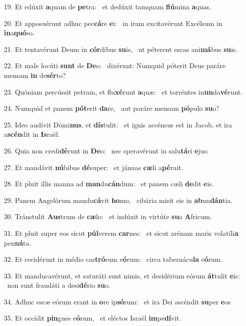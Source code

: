 19. Et edúxit \textbf{a}quam de \textbf{pe}tra: \ast\  et dedúxit tamquam \textbf{flú}mina \textbf{a}quas.\

20. Et apposuérunt adhuc pec\textbf{cá}re \textbf{e}i: \ast\  in iram excitavérunt Excélsum in \textbf{in}a\textbf{quó}so.\

21. Et tentavérunt Deum in \textbf{cór}dibus \textbf{su}is, \ast\  ut péterent escas ani\textbf{má}bus \textbf{su}is.\

22. Et male locúti \textbf{sunt} de \textbf{De}o: \ast\  dixérunt: Numquid póterit Deus paráre mensam \textbf{in} de\textbf{sér}to?\

23. Quóniam percússit petram, et flu\textbf{xé}runt \textbf{a}quæ: \ast\  et torréntes in\textbf{un}da\textbf{vé}runt.\

24. Numquid et panem \textbf{pót}erit \textbf{da}re, \ast\  aut paráre mensam \textbf{pó}pulo \textbf{su}o?\

25. Ideo audívit Dómi\textbf{nus}, et \textbf{dís}tulit: \ast\  et ignis accénsus est in Jacob, et ira a\textbf{scén}dit in \textbf{Is}raël.\

26. Quia non credi\textbf{dé}runt in \textbf{De}o: \ast\  nec speravérunt in salu\textbf{tá}ri \textbf{e}jus:\

27. Et mandávit \textbf{nú}bibus \textbf{dé}super: \ast\  et jánuas \textbf{cæ}li a\textbf{pé}ruit.\

28. Et pluit illis manna ad \textbf{man}du\textbf{cán}dum: \ast\  et panem cæli \textbf{de}dit \textbf{e}is.\

29. Panem Angelórum mandu\textbf{cá}vit \textbf{ho}mo, \ast\  cibária misit eis in \textbf{ab}un\textbf{dán}tia.\

30. Tránstulit \textbf{Aus}trum de \textbf{cæ}lo: \ast\  et indúxit in virtúte \textbf{su}a \textbf{A}fricum.\

31. Et pluit super eos sicut \textbf{púl}verem \textbf{car}nes: \ast\  et sicut arénam maris volatíli\textbf{a} pen\textbf{ná}ta.\

32. Et cecidérunt in médio cas\textbf{tró}rum e\textbf{ó}rum: \ast\  circa tabernácu\textbf{la} e\textbf{ó}rum.\

33. Et manducavérunt, et saturáti sunt nimis, et desidérium eórum \textbf{át}tulit \textbf{e}is: \ast\  non sunt fraudáti a desi\textbf{dé}rio \textbf{su}o.\

34. Adhuc escæ eórum erant in \textbf{o}re ip\textbf{só}rum: \ast\  et ira Dei ascéndit \textbf{su}per \textbf{e}os\

35. Et occídit \textbf{pin}gues e\textbf{ó}rum, \ast\  et eléctos Israël \textbf{im}pe\textbf{dí}vit.\

